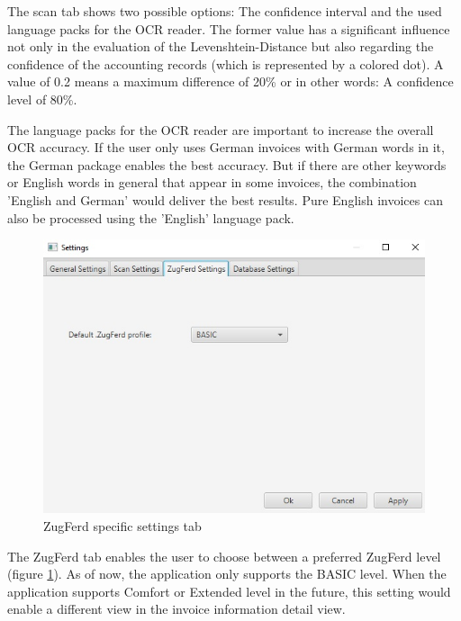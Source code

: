 The scan tab shows two possible options: The confidence interval and the used language packs for the OCR reader. The former value has a significant influence not only in the evaluation of the Levenshtein-Distance but also regarding the confidence of the accounting records (which is represented by a colored dot). A value of 0.2 means a maximum difference of 20\% or in other words: A confidence level of 80\%.

The language packs for the OCR reader are important to increase the overall OCR accuracy. If the user only uses German invoices with German words in it, the German package enables the best accuracy. But if there are other keywords or English words in general that appear in some invoices, the combination 'English and German' would deliver the best results. Pure English invoices can also be processed using the 'English' language pack.

\begin{figure}[ht!]
\centering
\includegraphics[scale=0.6]{Images/GUI/settings_ZugFerd.jpg}
\caption{ZugFerd specific settings tab \label{settings_ZugFerd}}
\end{figure}

The ZugFerd tab enables the user to choose between a preferred ZugFerd level (figure \ref{settings_ZugFerd}). As of now, the application only supports the BASIC level. When the application supports Comfort or Extended level in the future, this setting would enable a different view in the invoice information detail view.

